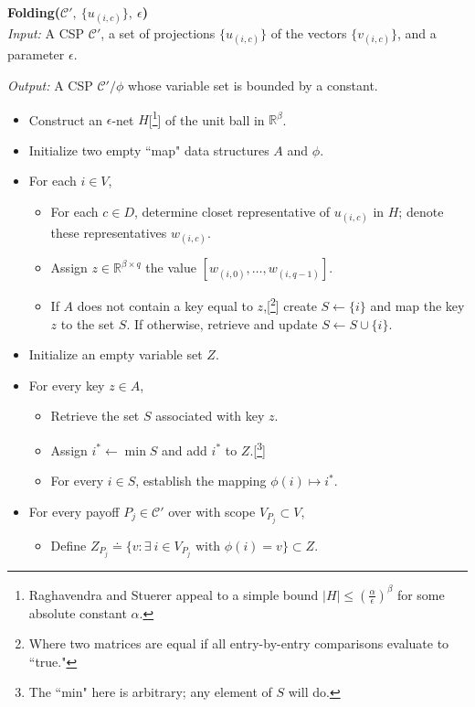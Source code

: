 \documentclass[letterpaper, 12pt]{article}
\numberwithin{equation}{section}
\begin{document}
\begin{algorithm} \textbf{ Folding($\mathcal{C}',~\{u_{(i,c)}\}, ~\epsilon$)} \\

\textit{Input: } A CSP $\mathcal{C}'$, a set of projections $\{u_{(i,c)}\}$ of the vectors $\{v_{(i,c)}\}$, and a parameter $\epsilon$. 

\textit{Output: } A CSP $\mathcal{C}'/\phi$ whose variable set is bounded by a constant.

\begin{itemize}
\item Construct an $\epsilon$-net $H$[\footnote{Raghavendra and Stuerer appeal to a simple bound $|H| \leq \left(\frac{\alpha}{\epsilon}\right)^\beta$ for some absolute constant $\alpha$.}] of the unit ball in $\mathbb{R}^\beta$.
\item Initialize two empty ``map" data structures $A$ and $\phi$.
\item For each $i \in V$, 
	\begin{itemize}
	\item For each $c \in D$, determine closet representative of $u_{(i,c)}$ in $H$;
		denote these representatives $w_{(i,c)}$. 
	\item Assign $z \in \mathbb{R}^{\beta \times q}$ the value $ [w_{(i,0)},  \ldots, w_{(i,q-1)}]$.
	\item If $A$ does not contain a key equal to $z$,[\footnote{Where two matrices are equal if all entry-by-entry comparisons evaluate to ``true."}] create $S \leftarrow \{i\}$ and map the key $z$ to the set $S$. 
		If otherwise, retrieve and update $S \leftarrow S\cup\{i\}$.
	\end{itemize}
\item Initialize an empty variable set $Z$.
\item For every key $z \in A$, 
	\begin{itemize}
	\item Retrieve the set $S$ associated with key $z$. 
	\item Assign $i^* \leftarrow \min S$ and add $i^*$ to $Z$.[\footnote{The ``min" here is arbitrary; any element of $S$ will do.}]
	\item For every $i \in S$, establish the mapping $\phi(i) \mapsto i^*$.
	\end{itemize}
\item For every payoff $P_j \in \mathcal{C}'$ over with scope $V_{P_j} \subset V$, 
	\begin{itemize}
	\item Define $Z_{P_j} \doteq \{v : \exists ~ i \in V_{P_j}\text{ with } \phi(i) = v \} \subset Z$.

\end{itemize}
\end{itemize}
\end{algorithm}
\end{document}
